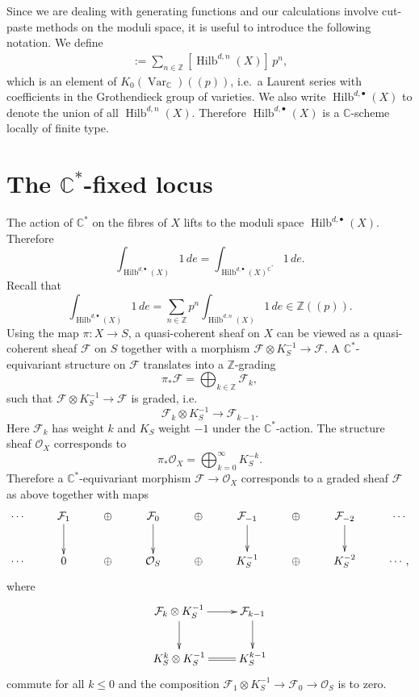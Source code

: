 \documentclass{amsart}
\theoremstyle{definition}
\newcommand{\CC} {\mathbb{C}}          %
\newcommand{\ZZ} {\mathbb{Z}}		%
\renewcommand{\O}{\mathcal{O}}
\newcommand{\Hilb}{\operatorname{Hilb}}
\newcommand{\Var}{\operatorname{Var}}
\newcommand{\F}{\mathcal{F}}
\begin{document}
Since we are dealing with generating functions and our calculations involve cut-paste methods on the moduli space, it is useful to introduce the following notation. We define
\begin{align*}
[\Hilb^{d,\bullet}(X)] := \sum_{n \in \ZZ} [\Hilb^{d,n}(X)] \, p^n,
\end{align*}
which is an element of $K_0(\Var_{\CC})(\!(p)\!)$, i.e.~a Laurent series with coefficients in the Grothendieck group of varieties. We also write $\Hilb^{d,\bullet}(X)$ to denote the union of all $\Hilb^{d,n}(X)$. Therefore $\Hilb^{d,\bullet}(X)$ is a $\CC$-scheme locally of finite type.


\section{The $\CC^*$-fixed locus} \label{fixedlocus}

The action of $\CC^*$ on the fibres of $X$ lifts to the moduli space $\Hilb^{d,\bullet}(X)$. Therefore
$$
\int_{\Hilb^{d,\bullet}(X)} 1 \, de = \int_{\Hilb^{d,\bullet}(X)^{\CC^*}} 1 \, de.
$$
Recall that 
$$
\int_{\Hilb^{d,\bullet}(X)} 1 \, de = \sum_{n \in \ZZ} p^n \int_{\Hilb^{d,n}(X)} 1 \, de \in \ZZ(\!(p)\!).
$$
Using the map $\pi : X \rightarrow S$, a quasi-coherent sheaf on $X$ can be viewed as a quasi-coherent sheaf $\F$ on $S$ together with a morphism $\F \otimes K_{S}^{-1} \rightarrow \F$. A $\CC^*$-equivariant structure on $\F$ translates into a $\ZZ$-grading
$$
\pi_* \F = \bigoplus_{k \in \ZZ} \F_k,
$$
such that $\F \otimes K_{S}^{-1} \rightarrow \F$ is graded, i.e.
$$
\F_k \otimes K_{S}^{-1} \longrightarrow \F_{k-1}.
$$
Here $\F_k$ has weight $k$ and $K_{S}$ weight $-1$ under the $\CC^*$-action. The structure sheaf $\O_X$ corresponds to 
$$
\pi_* \O_X = \bigoplus_{k=0}^{\infty} K_{S}^{-k}.
$$
Therefore a $\CC^*$-equivariant morphism $\F \rightarrow \O_X$ corresponds to a graded sheaf $\F$ as above together with maps
\begin{displaymath}
\xymatrix
{
\cdots & \F_1 \ar[d] & \oplus & \F_0 \ar[d] & \oplus & \F_{-1} \ar[d] & \oplus & \F_{-2} \ar[d] & \cdots \\
\cdots &  0 & \oplus & \O_S & \oplus & K_{S}^{-1} & \oplus & K_{S}^{-2} & \cdots, 
}
\end{displaymath}
where 
\begin{displaymath}
\xymatrix
{
\F_k \otimes K_{S}^{-1} \ar[r] \ar[d] & \F_{k-1} \ar[d] \\
K_{S}^{k} \otimes K_{S}^{-1} \ar@{=}[r] & K_{S}^{k-1}
}
\end{displaymath}
commute for all $k\leq 0$ and the composition $\F_1 \otimes K_{S}^{-1} \rightarrow \F_0 \rightarrow \O_S$ is to zero. 
\end{document}

